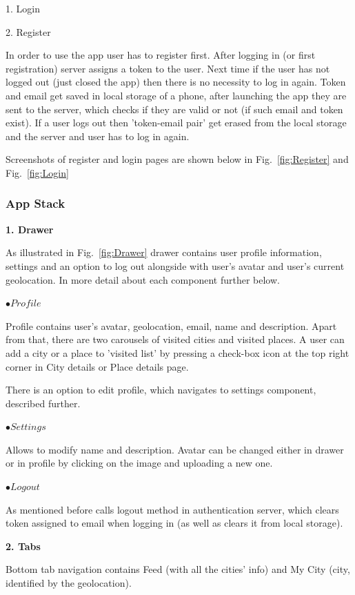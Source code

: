 1. Login

2. Register

In order to use the app user has to register first. 
After logging in (or first registration) server assigns a token to the user.
Next time if the user has not logged out (just closed the app) then there is no necessity to log in again. Token and email get saved in local storage of a phone, after launching the app they are sent to the server, which checks if they are valid or not (if such email and token exist). 
If a user logs out then 'token-email pair' get erased from the local storage and the server and user has to log in again.

Screenshots of register and login pages are shown below in Fig.~\ref{fig:Register} and Fig.~\ref{fig:Login}

\subsubsection{App Stack}

\textbf{1. Drawer}

As illustrated in Fig.~\ref{fig:Drawer} drawer contains user profile information, settings and an option to log out alongside with user's avatar and user's current geolocation. In more detail about each component further below.

$\bullet Profile$

Profile contains user's avatar, geolocation, email, name and description. Apart from that, there are two carousels of visited cities and visited places. A user can add a city or a place to 'visited list' by pressing a check-box icon at the top right corner in City details or Place details page.

There is an option to edit profile, which navigates to settings component, described further.

$ \bullet Settings$

Allows to modify name and description. Avatar can be changed either in drawer or in profile by clicking on the image and uploading a new one.

$\bullet Log out$

As mentioned before calls logout method in authentication server, which clears token assigned to email when logging in (as well as clears it from local storage).

\textbf{2. Tabs }

Bottom tab navigation contains Feed (with all the cities' info) and My City (city, identified by the geolocation).

